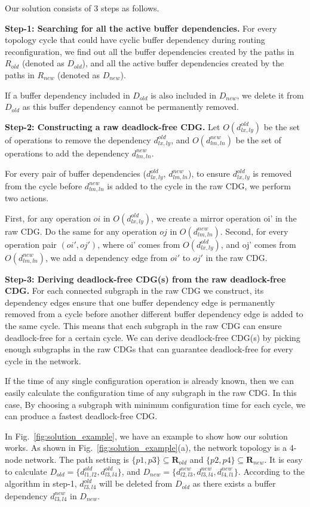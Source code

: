 Our solution consists of 3 steps as follows.

\textbf{Step-1: Searching for all the active buffer dependencies.} For every topology cycle that could have cyclic buffer dependency during routing reconfiguration, we find out all the buffer dependencies created by the paths in $R_{old}$ (denoted as $D_{old}$), and all the active buffer dependencies created by the paths in $R_{new}$ (denoted as $D_{new}$). 

If a buffer dependency included in $D_{old}$ is also included in $D_{new}$, we delete it from $D_{old}$ as this buffer dependency cannot be permanently removed.

\textbf{Step-2: Constructing a raw deadlock-free CDG.} Let $O(d^{old}_{lx,ly})$ be the set of operations to remove the dependency $d^{old}_{lx,ly}$, and $O(d^{new}_{lm,ln})$ be the set of operations to add the dependency $d^{new}_{lm,ln}$.

For every pair of buffer dependencies ($d^{old}_{lx,ly}$,  $d^{new}_{lm,ln}$), to ensure $d^{old}_{lx,ly}$ is removed from the cycle before  $d^{new}_{lm,ln}$ is added to the cycle in the raw CDG, we perform two actions. 

First,  for any operation $oi$ in $O(d^{old}_{lx,ly})$, we create a mirror operation oi' in the raw CDG. Do the same for any operation $oj$ in $O(d^{new}_{lm,ln})$. Second, for every operation pair $(oi', oj')$, where oi' comes from $O(d^{old}_{lx,ly})$, and oj' comes from $O(d^{new}_{lm,ln})$, we add a dependency edge from $oi'$ to $oj'$ in the raw CDG.

\textbf{Step-3: Deriving deadlock-free CDG(s) from the raw deadlock-free CDG.}  For each connected subgraph in the raw CDG we construct,  its dependency edges ensure that one buffer dependency edge is permanently removed from a cycle before another different buffer dependency edge is added to the same cycle. This means that each subgraph in the raw CDG can ensure deadlock-free for a certain cycle. We can derive deadlock-free CDG(s)
by picking enough subgraphs in the raw CDGs that can guarantee deadlock-free for every cycle in the network.

If the time of any single configuration operation is already known, then we can easily calculate the configuration time of any subgraph in the raw CDG. In this case, By choosing a subgraph with minimum configuration time for each cycle, we can produce a fastest deadlock-free CDG.



In Fig.~\ref{fig:solution_example}, we have an example to show how our solution works. As shown in Fig.~\ref{fig:solution_example}(a), the network topology is a 4-node network. The path setting is $\{p1, p3\}\subseteq \textbf{R}_{old}$ and $\{p2, p4\}\subseteq \textbf{R}_{new}$. It is easy to calculate $D_{old}=\{d^{old}_{l1,l2},  d^{old}_{l3,l4}\}$, and $D_{new}=\{d^{new}_{l2,l3},  d^{new}_{l3,l4},  d^{new}_{l4,l1}\}$.  According to the algorithm in step-1, $d^{old}_{l3,l4}$ will be deleted from $D_{old}$ as there exists a buffer dependency $d^{new}_{l3,l4}$ in $D_{new}$.


